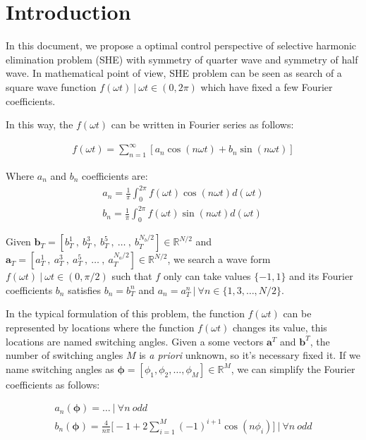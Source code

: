 \section{Introduction}

In this document, we propose  a optimal control  perspective of selective harmonic elimination problem (SHE) with symmetry of quarter wave and symmetry of half wave. 
%
In mathematical point of view, SHE problem can be seen as search of a square wave function  $f(\omega t ) \ | \ \omega t \in (0,2\pi)$ which have fixed a few Fourier coefficients. 
\newline

%
In this way, the $f(\omega t)$ can be written in Fourier series as follows:

\begin{gather}
    f(\omega t ) = \sum_{n=1}^\infty [a_n \cos(n\omega t) + b_n \sin(n \omega t)] 
\end{gather}

Where $a_n$ and $b_n$ coefficients are:
\begin{gather}
    a_n = \frac{1}{\pi} \int_0^{2\pi} f(\omega t ) \cos(n\omega t)d(\omega t) \label{an} \\
    b_n = \frac{1}{\pi} \int_0^{2\pi} f(\omega t ) \sin(n\omega t)d(\omega t) \label{bn}  
\end{gather}

\begin{problem}\label{SHEp}
    Given  $\bm{b}_T = [b^1_T \ , \ b^3_T \  , \ b^5_T \ , \ \dots \ , \ b^{N_b/2}_T] \in \mathbb{R}^{N/2}$ and  $\bm{a}_T = [a^1_T \ , \ a^3_T \  , \ a^5_T \ , \ \dots \ , \ a^{N_a/2}_T] \in \mathbb{R}^{N/2}$, we search a wave form $f(\omega t ) \ | \ \omega t \in (0,\pi/2)$ such that $f$ only can take values  $\{-1,1\}$ and its Fourier coefficients $b_n$ satisfies $b_n=b_T^n$ and  $a_n=a_T^n \ | \ \forall n \in \{1,3,\dots,N/2 \}$. 
\end{problem}

In the typical formulation of this problem, the function $f(\omega t)$ can be represented by locations  where the function $f(\omega t)$ changes its value, this locations are named switching angles.
%
Given a some vectors $\bm{a}^T$ and $\bm{b}^T$, the number of switching angles $M$ is \emph{a priori} unknown, so it's necessary fixed it. If we name switching angles as $\bm{\phi} = [\phi_1,\phi_2,\dots,\phi_M] \in \mathbb{R}^M $, we can simplify the Fourier coefficients as follows:

\begin{gather}
    a_n(\bm{\phi})  = \dots  \ | \ \forall n \ odd \\
    b_n(\bm{\phi})  =  \frac{4}{n\pi  } \bigg[ -1 + 2\sum_{i=1}^M  (-1)^{i+1}\cos(n\phi_i) \bigg] \ | \ \forall n \ odd
\end{gather}

